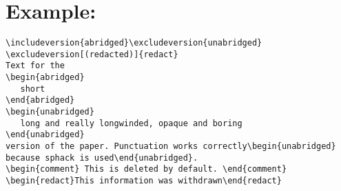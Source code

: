 \documentclass[pagesize=auto, fontsize=12pt, DIV=10]{scrartcl}
\begin{document}
\section{Example:}

\begin{lstlisting}
\includeversion{abridged}\excludeversion{unabridged}
\excludeversion[(redacted)]{redact}
Text for the
\begin{abridged}
   short
\end{abridged}
\begin{unabridged}
   long and really longwinded, opaque and boring
\end{unabridged}
version of the paper. Punctuation works correctly\begin{unabridged}
because sphack is used\end{unabridged}.
\begin{comment} This is deleted by default. \end{comment}
\begin{redact}This information was withdrawn\end{redact}
\end{lstlisting}
\end{document}
